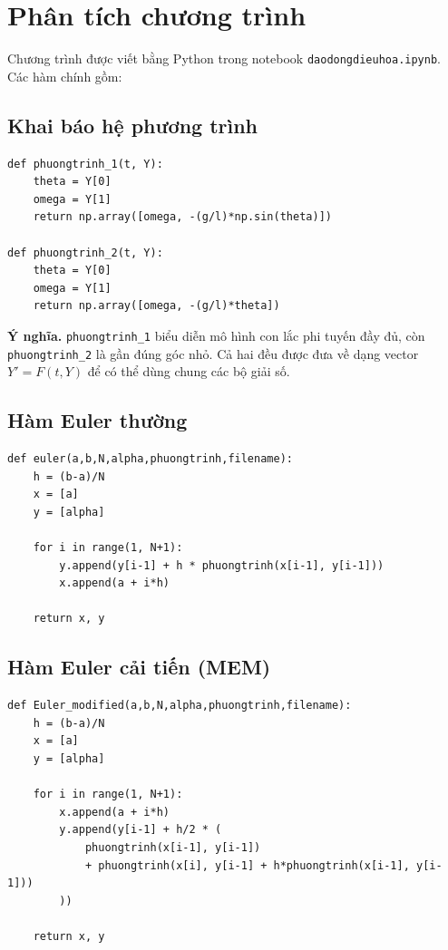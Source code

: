 \documentclass{article}
\begin{document}
\section{Phân tích chương trình}

Chương trình được viết bằng Python trong notebook \texttt{daodongdieuhoa.ipynb}. Các hàm chính gồm:

\subsection{Khai báo hệ phương trình}
\begin{lstlisting}[style=mypython,caption={Khai báo hai hệ phương trình của bài toán con lắc}]
def phuongtrinh_1(t, Y):
    theta = Y[0]
    omega = Y[1]
    return np.array([omega, -(g/l)*np.sin(theta)])

def phuongtrinh_2(t, Y):
    theta = Y[0]
    omega = Y[1]
    return np.array([omega, -(g/l)*theta])
\end{lstlisting}

\textbf{Ý nghĩa.} 
\texttt{phuongtrinh\_1} biểu diễn mô hình con lắc phi tuyến đầy đủ, còn \texttt{phuongtrinh\_2} là gần đúng góc nhỏ. Cả hai đều được đưa về dạng vector $Y' = F(t,Y)$ để có thể dùng chung các bộ giải số.

\subsection{Hàm Euler thường}
\begin{lstlisting}[style=mypython,caption={Thuật toán Euler thường}]
def euler(a,b,N,alpha,phuongtrinh,filename):
    h = (b-a)/N
    x = [a]
    y = [alpha]

    for i in range(1, N+1):
        y.append(y[i-1] + h * phuongtrinh(x[i-1], y[i-1]))
        x.append(a + i*h)

    return x, y
\end{lstlisting}

\subsection{Hàm Euler cải tiến (MEM)}
\begin{lstlisting}[style=mypython,caption={Thuật toán Euler cải tiến}]
def Euler_modified(a,b,N,alpha,phuongtrinh,filename):
    h = (b-a)/N
    x = [a]
    y = [alpha]

    for i in range(1, N+1):
        x.append(a + i*h)
        y.append(y[i-1] + h/2 * (
            phuongtrinh(x[i-1], y[i-1])
            + phuongtrinh(x[i], y[i-1] + h*phuongtrinh(x[i-1], y[i-1]))
        ))

    return x, y
\end{lstlisting}
\end{document}

